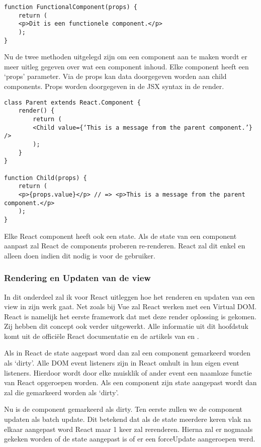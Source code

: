 \begin{verbatim}
function FunctionalComponent(props) {
	return (
	<p>Dit is een functionele component.</p>
	);
}
\end{verbatim}

Nu de twee methoden uitgelegd zijn om een component aan te maken wordt er meer uitleg gegeven over wat een component inhoud. Elke component heeft een ‘props’ parameter. Via de props kan data doorgegeven worden aan child components. Props worden doorgegeven in de JSX syntax in de render.

\begin{verbatim}
class Parent extends React.Component {
	render() {
		return (
		<Child value={‘This is a message from the parent component.’} />
		);
	}
}

function Child(props) {
	return (
	<p>{props.value}</p> // => <p>This is a message from the parent component.</p>
	);
}
\end{verbatim}

Elke React component heeft ook een state. Als de state van een component aanpast zal React de components proberen re-renderen. React zal dit enkel en alleen doen indien dit nodig is voor de gebruiker.

\subsubsection{Rendering en Updaten van de view}
\label{sec:React_Rendering_Updaten}
In dit onderdeel zal ik voor React uitleggen hoe het renderen en updaten van een view in zijn werk gaat. Net zoals bij Vue zal React werken met een Virtual DOM. React is namelijk het eerste framework dat met deze render oplossing is gekomen. Zij hebben dit concept ook verder uitgewerkt. Alle informatie uit dit hoofdstuk komt uit de officiële React documentatie \autocite{_react_2018} en de artikels van \textcite{mishra_hackernoon_2017} en \textcite{kurian_medium_2017}.

Als in React de state aagepast word dan zal een component gemarkeerd worden als ‘dirty’. Alle DOM event listeners zijn in React omhult in hun eigen event listeners. Hierdoor wordt door elke muisklik of ander event een naamloze functie van React opgeroepen worden. Als een component zijn state aangepast wordt dan zal die gemarkeerd worden als ‘dirty’.

Nu is de component gemarkeerd als dirty. Ten eerste zullen we de component updaten als batch update. Dit betekend dat als de state meerdere keren vlak na elkaar aangepast word React maar 1 keer zal rerenderen. Hierna zal er nogmaals gekeken worden of de state aangepast is of er een forceUpdate aangeroepen werd.

